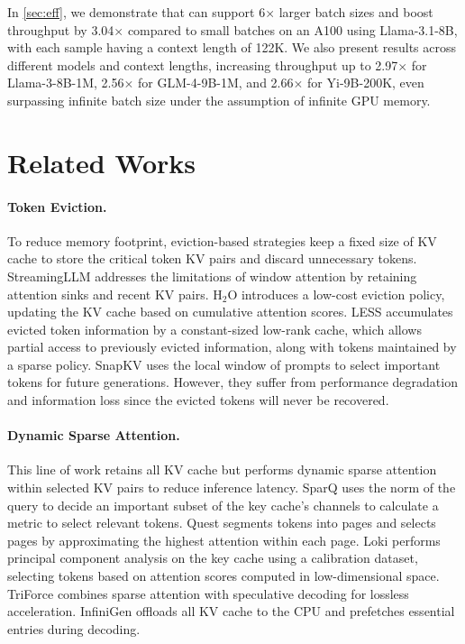 In \cref{sec:eff}, we demonstrate that \Sys can support 6$\times$ larger batch sizes and boost throughput by 3.04$\times$ compared to small batches on an A100 using Llama-3.1-8B, with each sample having a context length of 122K. We also present results across different models and context lengths, increasing throughput up to 2.97$\times$ for Llama-3-8B-1M, 2.56$\times$ for GLM-4-9B-1M, and 2.66$\times$ for Yi-9B-200K, even surpassing infinite batch size  under the assumption of infinite GPU memory.\section{Related Works}
\paragraph{Token Eviction.} To reduce memory footprint, eviction-based strategies keep a fixed size of KV cache to store the critical token KV pairs and discard unnecessary tokens. StreamingLLM \citep{xiao2023efficient} addresses the limitations of window attention by retaining attention sinks and recent KV pairs. H$_2$O \citep{zhang2024h2o} introduces a low-cost eviction policy, updating the KV cache based on cumulative attention scores. LESS \citep{dong2024get} accumulates evicted token information by a constant-sized low-rank cache, which allows partial access to previously evicted information, along with tokens maintained by a sparse policy. SnapKV \citep{li2024snapkv} uses the local window of prompts to select important tokens for future generations. However, they suffer from performance degradation and information loss since the evicted tokens will never be recovered.
\paragraph{Dynamic Sparse Attention.} This line of work retains all KV cache but performs dynamic sparse attention within selected KV pairs to reduce inference latency. SparQ \citep{ribar2023sparq} uses the norm of the query to decide an important subset of the key cache's channels to calculate a metric to select relevant tokens. Quest \citep{tang2024quest} segments tokens into pages and selects pages by approximating the highest attention within each page. Loki \citep{singhania2024loki} performs principal component analysis on the key cache using a calibration dataset, selecting tokens based on attention scores computed in low-dimensional space. TriForce \citep{sun2024triforce} combines sparse attention with speculative decoding \citep{leviathan2023fast} for lossless acceleration. InfiniGen \citep{lee-osdi24} offloads all KV cache to the CPU and prefetches essential entries during decoding.
